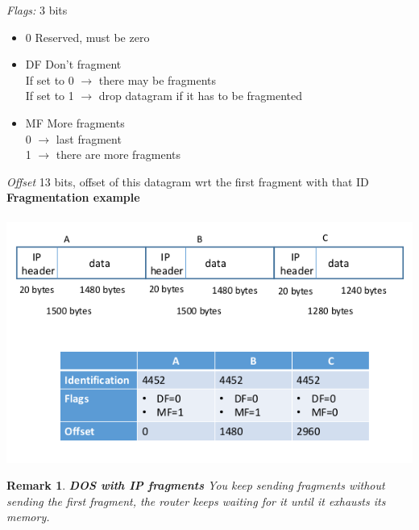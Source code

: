 \documentclass[10pt,a4paper]{article}
\newtheorem{remark}{Remark}
\begin{document}
\emph{Flags:} 3 bits
\begin{itemize}
\item 0 Reserved, must be zero
\item DF Don't fragment\\
If set to 0 $\to$ there may be fragments\\
If set to 1 $\to$ drop datagram if it has to be fragmented
\item MF More fragments\\
0 $\to$ last fragment\\
1 $\to$ there are more fragments
\end{itemize}
\emph{Offset} 13 bits, offset of this datagram wrt the first fragment with that ID
\newpage
\textbf{Fragmentation example}\\\\
\includegraphics[scale=0.6]{fragmentation.png}\\
\begin{remark}
\textbf{DOS with IP fragments}
You keep sending fragments without sending the first fragment, the router keeps waiting for it until it exhausts its memory.
\end{remark}
\newpage
\end{document}
